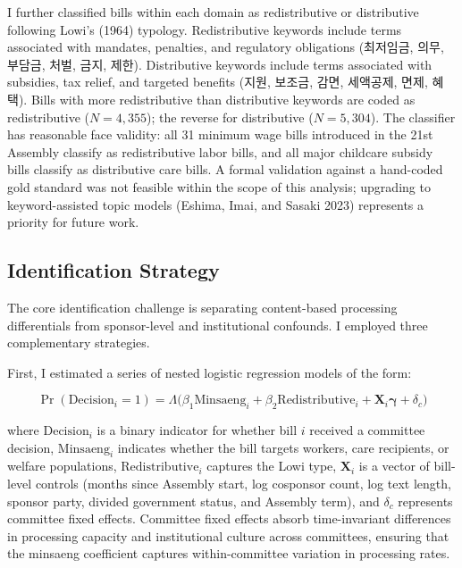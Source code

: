 \documentclass[11pt]{article}
\begin{document}
I further classified bills within each domain as redistributive or distributive following Lowi's (1964) typology. Redistributive keywords include terms associated with mandates, penalties, and regulatory obligations (최저임금, 의무, 부담금, 처벌, 금지, 제한). Distributive keywords include terms associated with subsidies, tax relief, and targeted benefits (지원, 보조금, 감면, 세액공제, 면제, 혜택). Bills with more redistributive than distributive keywords are coded as redistributive ($N = 4{,}355$); the reverse for distributive ($N = 5{,}304$). The classifier has reasonable face validity: all 31 minimum wage bills introduced in the 21st Assembly classify as redistributive labor bills, and all major childcare subsidy bills classify as distributive care bills. A formal validation against a hand-coded gold standard was not feasible within the scope of this analysis; upgrading to keyword-assisted topic models (Eshima, Imai, and Sasaki 2023) represents a priority for future work.


\subsection{Identification Strategy}

The core identification challenge is separating content-based processing differentials from sponsor-level and institutional confounds. I employed three complementary strategies.

First, I estimated a series of nested logistic regression models of the form:

\begin{equation}
\Pr(\text{Decision}_i = 1) = \Lambda\bigl(\beta_1 \text{Minsaeng}_i + \beta_2 \text{Redistributive}_i + \mathbf{X}_i \boldsymbol{\gamma} + \delta_c\bigr)
\label{eq:main}
\end{equation}

\noindent where $\text{Decision}_i$ is a binary indicator for whether bill $i$ received a committee decision, $\text{Minsaeng}_i$ indicates whether the bill targets workers, care recipients, or welfare populations, $\text{Redistributive}_i$ captures the Lowi type, $\mathbf{X}_i$ is a vector of bill-level controls (months since Assembly start, log cosponsor count, log text length, sponsor party, divided government status, and Assembly term), and $\delta_c$ represents committee fixed effects. Committee fixed effects absorb time-invariant differences in processing capacity and institutional culture across committees, ensuring that the minsaeng coefficient captures within-committee variation in processing rates.
\end{document}
